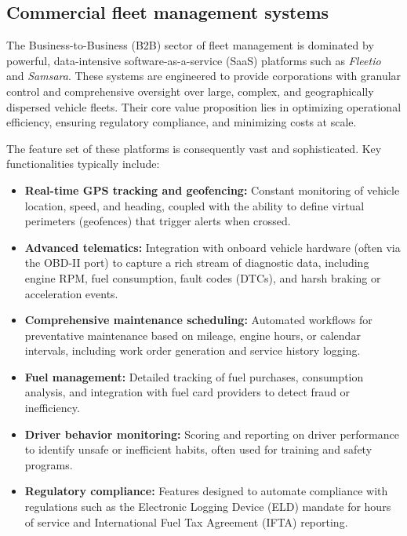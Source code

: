 \subsection{Commercial fleet management systems}
The Business-to-Business (B2B) sector of fleet management is dominated by powerful, data-intensive software-as-a-service (SaaS) platforms such as \textit{Fleetio} and \textit{Samsara}. These systems are engineered to provide corporations with granular control and comprehensive oversight over large, complex, and geographically dispersed vehicle fleets. Their core value proposition lies in optimizing operational efficiency, ensuring regulatory compliance, and minimizing costs at scale.

\textgap

The feature set of these platforms is consequently vast and sophisticated. Key functionalities typically include:
\begin{itemize}
    \item \textbf{Real-time GPS tracking and geofencing:} Constant monitoring of vehicle location, speed, and heading, coupled with the ability to define virtual perimeters (geofences) that trigger alerts when crossed.
    \item \textbf{Advanced telematics:} Integration with onboard vehicle hardware (often via the OBD-II port) to capture a rich stream of diagnostic data, including engine RPM, fuel consumption, fault codes (DTCs), and harsh braking or acceleration events.
    \item \textbf{Comprehensive maintenance scheduling:} Automated workflows for preventative maintenance based on mileage, engine hours, or calendar intervals, including work order generation and service history logging.
    \item \textbf{Fuel management:} Detailed tracking of fuel purchases, consumption analysis, and integration with fuel card providers to detect fraud or inefficiency.
    \item \textbf{Driver behavior monitoring:} Scoring and reporting on driver performance to identify unsafe or inefficient habits, often used for training and safety programs.
    \item \textbf{Regulatory compliance:} Features designed to automate compliance with regulations such as the Electronic Logging Device (ELD) mandate for hours of service and International Fuel Tax Agreement (IFTA) reporting.
\end{itemize}

